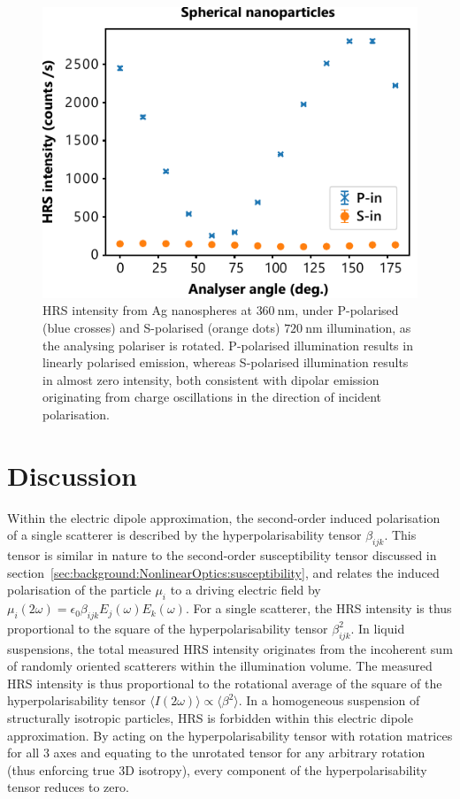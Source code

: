 \begin{figure}[htb!]	
    \centering	
    \includegraphics[scale=1.0]{./figures/results/HRS/hrs_spheres.pdf}
    \caption{\label{fig:results:HRS:hrs_spheres}
    HRS intensity from Ag nanospheres at $\SI{360}{\nano\m}$, under P-polarised (blue crosses) and S-polarised (orange dots) $\SI{720}{\nano\m}$ illumination, as the analysing polariser is rotated. P-polarised illumination results in linearly polarised emission, whereas S-polarised illumination results in almost zero intensity, both consistent with dipolar emission originating from charge oscillations in the direction of incident polarisation.}	
\end{figure}

\section{Discussion}

Within the electric dipole approximation, the second-order induced polarisation of a single scatterer is described by the hyperpolarisability tensor $\beta_{ijk}$. This tensor is similar in nature to the second-order susceptibility tensor discussed in section~\ref{sec:background:NonlinearOptics:susceptibility}, and relates the induced polarisation of the particle $\mu_{i}$ to a driving electric field by $\mu_{i}(2\omega) =  \epsilon_{0} \beta_{ijk} E_{j}(\omega) E_{k}(\omega)$. For a single scatterer, the HRS intensity is thus proportional to the square of the hyperpolarisability tensor $\beta_{ijk}^2$. In liquid suspensions, the total measured HRS intensity originates from the incoherent sum of randomly oriented scatterers within the illumination volume.
The measured HRS intensity is thus proportional to the rotational average of the square of the hyperpolarisability tensor $\langle I(2\omega) \rangle \propto \langle \beta^{2} \rangle$.
In a homogeneous suspension of structurally isotropic particles, HRS is forbidden within this electric dipole approximation. By acting on the hyperpolarisability tensor with rotation matrices for all 3 axes and equating to the unrotated tensor for any arbitrary rotation (thus enforcing true 3D isotropy), every component of the hyperpolarisability tensor reduces to zero.

